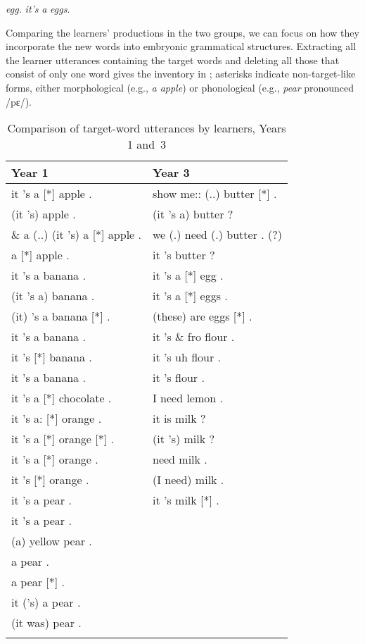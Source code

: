 \documentclass[output=paper,colorlinks,citecolor=brown,modfonts,nonflat]{../langscibook}
\begin{document}
\textit{egg.} \textit{it’s} \textit{a} \textit{eggs}. 

\largerpage
Comparing the learners’ productions in the two groups, we can focus on how they incorporate the new words into embryonic grammatical structures. Extracting all the learner utterances containing the target words and deleting all those that consist of only one word gives the inventory in ; asterisks indicate non-target-like forms, either morphological (e.g., \textit{a apple}) or phonological (e.g., \textit{pear} pronounced /pɛ/).

\begin{table}
\caption{Comparison of target-word utterances by learners, Years 1 and~3\label{tab:hilton:6}}
\begin{tabularx}{\textwidth}{QQ}
\lsptoprule
Year 1 & Year 3\\
\midrule
it 's a [*] apple . & show me:: (..) butter [*] .\\
(it 's) apple . & (it 's a) butter ?\\
\& a (..) (it 's) a [*] apple . & we (.) need (.) butter . (?)\\
a [*] apple . & it 's butter ?\\
it 's a banana . & it 's a [*] egg .\\
(it 's a) banana . & it 's a [*] eggs .\\
(it) 's a banana [*] . & (these) are eggs [*] .\\
it 's a banana . & it 's \& fro flour .\\
it 's [*] banana . & it 's uh flour .\\
it 's a banana . & it 's flour .\\
it 's a [*] chocolate . & I need lemon .\\
it 's a: [*] orange . & it is milk ?\\
it 's a [*] orange [*] . & (it 's) milk ?\\
it 's a [*] orange . & need milk .\\
 it 's [*] orange . & (I need) milk .\\
it 's a pear . & it 's milk [*] .\\
it 's a pear . & \\
(a) yellow pear . & \\
a pear . & \\
a pear [*] . & \\
it ('s) a pear . & \\
(it was) pear . & \\
\lspbottomrule
\end{tabularx}
\end{table}
\end{document}
